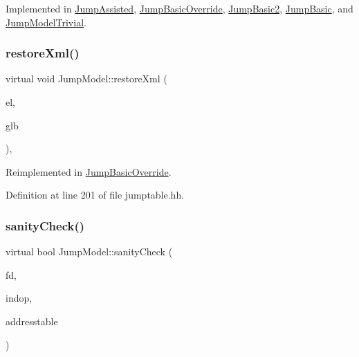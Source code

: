 Implemented in \mbox{\hyperlink{class_jump_assisted_a54a3d21e91b75d420340cd403a53fc63}{Jump\+Assisted}}, \mbox{\hyperlink{class_jump_basic_override_a4fd706bf7ee1023bd1d93c78ba66852f}{Jump\+Basic\+Override}}, \mbox{\hyperlink{class_jump_basic2_adc60ecb0d804d1a7754161b38ae3299f}{Jump\+Basic2}}, \mbox{\hyperlink{class_jump_basic_aebf055ad4baf1a138107d8dd3a40c809}{Jump\+Basic}}, and \mbox{\hyperlink{class_jump_model_trivial_ae05a183588550bc9102e12c80d7124b5}{Jump\+Model\+Trivial}}.

\mbox{\label{class_jump_model_ac0acbb92da0d5b490271a5a87f54dd00}} 
\subsubsection{\texorpdfstring{restoreXml()}{restoreXml()}}
{\footnotesize\ttfamily virtual void Jump\+Model\+::restore\+Xml (\begin{DoxyParamCaption}\item[{const \mbox{\hyperlink{class_element}{Element}} $\ast$}]{el,  }\item[{\mbox{\hyperlink{class_architecture}{Architecture}} $\ast$}]{glb }\end{DoxyParamCaption})\hspace{0.3cm}{\ttfamily [inline]}, {\ttfamily [virtual]}}



Reimplemented in \mbox{\hyperlink{class_jump_basic_override_afc4f40d7eaff7e5a25804dc57323b9db}{Jump\+Basic\+Override}}.



Definition at line 201 of file jumptable.\+hh.

\mbox{\label{class_jump_model_a76a52bf3311e9d97a61d1117f6de1b0a}} 
\subsubsection{\texorpdfstring{sanityCheck()}{sanityCheck()}}
{\footnotesize\ttfamily virtual bool Jump\+Model\+::sanity\+Check (\begin{DoxyParamCaption}\item[{\mbox{\hyperlink{class_funcdata}{Funcdata}} $\ast$}]{fd,  }\item[{\mbox{\hyperlink{class_pcode_op}{Pcode\+Op}} $\ast$}]{indop,  }\item[{vector$<$ \mbox{\hyperlink{class_address}{Address}} $>$ \&}]{addresstable }\end{DoxyParamCaption})\hspace{0.3cm}{\ttfamily [pure virtual]}}



